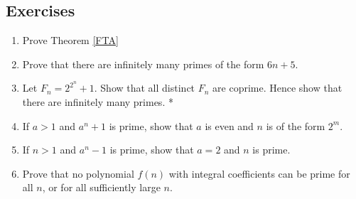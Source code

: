 \subsection{Exercises}
\begin{enumerate}
    \item Prove Theorem \ref{FTA}
    \item Prove that there are infinitely many primes of the form $6n+5$.
    \item Let $F_n = 2^{2^n} + 1$. Show that all distinct $F_n$ are coprime. Hence show that there are infinitely many primes. *
    \item If $a>1$ and $a^n + 1$ is prime, show that $a$ is even and $n$ is of the form $2^m$.
    \item If $n>1$ and $a^n - 1$ is prime, show that $a=2$ and $n$ is prime.
    \item Prove that no polynomial $f(n)$ with integral coefficients can be prime for all $n$, or for all sufficiently large $n$.
\end{enumerate}
